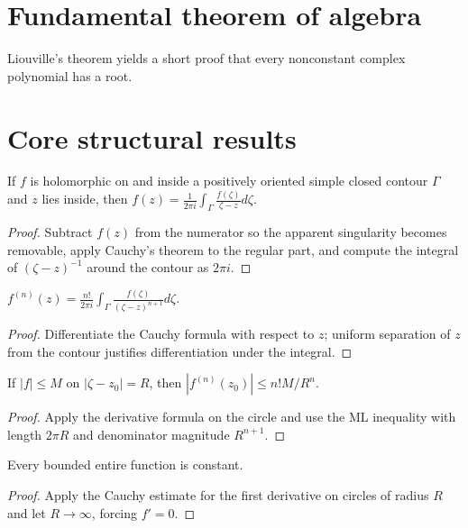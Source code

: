 \section{Fundamental theorem of algebra}
Liouville's theorem yields a short proof that every nonconstant complex polynomial has a root.

\section{Core structural results}

\begin{theorem}\label{thm:iv06-01}
If $f$ is holomorphic on and inside a positively oriented simple closed contour $\Gamma$ and $z$ lies inside, then $f(z)=\frac1{2\pi i}\int_\Gamma\frac{f(\zeta)}{\zeta-z}d\zeta$.
\begin{proof}
Subtract $f(z)$ from the numerator so the apparent singularity becomes removable, apply Cauchy's theorem to the regular part, and compute the integral of $(\zeta-z)^{-1}$ around the contour as $2\pi i$.
\end{proof}
\end{theorem}

\begin{theorem}\label{thm:iv06-02}
$f^{(n)}(z)=\frac{n!}{2\pi i}\int_\Gamma\frac{f(\zeta)}{(\zeta-z)^{n+1}}d\zeta$.
\begin{proof}
Differentiate the Cauchy formula with respect to $z$; uniform separation of $z$ from the contour justifies differentiation under the integral.
\end{proof}
\end{theorem}

\begin{theorem}\label{thm:iv06-03}
If $|f|\le M$ on $|\zeta-z_0|=R$, then $|f^{(n)}(z_0)|\le n!M/R^n$.
\begin{proof}
Apply the derivative formula on the circle and use the ML inequality with length $2\pi R$ and denominator magnitude $R^{n+1}$.
\end{proof}
\end{theorem}

\begin{theorem}\label{thm:iv06-04}
Every bounded entire function is constant.
\begin{proof}
Apply the Cauchy estimate for the first derivative on circles of radius $R$ and let $R\to\infty$, forcing $f'=0$.
\end{proof}
\end{theorem}

